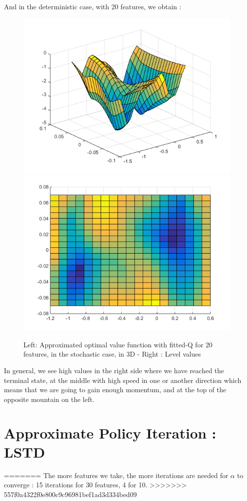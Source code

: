 \documentclass[a4paper, 12pt]{article}
\begin{document}
And in the deterministic case, with 20 features, we obtain :
\begin{figure}[H]
	\centering
	\noindent\includegraphics[scale=0.3]{fittedQ-5ep-5000draws-stochastic.png}
	\noindent\includegraphics[scale=0.3]{fittedQ-5ep-5000draws-stochastic-levels.png}
	\caption{Left: Approximated optimal value function with fitted-Q for 20 features, in the stochastic case, in 3D - Right : Level values}
\end{figure}

In general, we see high values in the right side where we have reached the terminal state, at the middle with high speed in one or another direction which means that we are going to gain enough momentum, and at the top of the opposite mountain on the left.

\section{Approximate Policy Iteration : LSTD}
=======
The more features we take, the more iterations are needed for $\alpha$ to converge : 15 iterations for 30 features, 4 for 10.
>>>>>>> 557f0a4322f0e800c9c96981bef1ad3d334bed09
\end{document}
